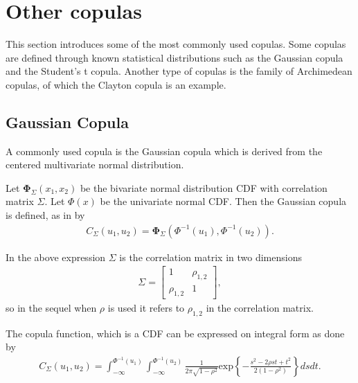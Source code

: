 \documentclass[%
a4paper,							
11pt,								
bibliography=totoc,						
abstracton=true					
]
{scrartcl}
\theoremstyle{plain}
\theoremstyle{definition}
\theoremstyle{remark}
\newcommand{\1}{\mathbbm{1}}
\begin{document}
\printbibliography


\section{Other copulas}\label{sec:OtherCopulas}
This section introduces some of the most commonly used copulas. Some copulas are defined through known statistical distributions such as the Gaussian copula and the Student's t copula. Another type of copulas is the family of Archimedean copulas, of which the Clayton copula is an example.

\subsection{Gaussian Copula}\label{sec:GaussianCopula}
A commonly used copula is the Gaussian copula which is derived from the centered multivariate normal distribution. 

Let $\boldsymbol{\Phi}_\Sigma(x_1,x_2)$ be the bivariate normal distribution \gls{CDF} with correlation matrix $\Sigma$. Let $\Phi(x)$ be the univariate normal \gls{CDF}. Then the Gaussian copula is defined, as in \citet[p.~112]{Umberto2004copulaMethods}  by 
\begin{align*}
    C_\Sigma(u_1,u_2) = \boldsymbol{\Phi}_\Sigma(\Phi^{-1}(u_1),\Phi^{-1}(u_2)).
\end{align*}

In the above expression $\Sigma$ is the correlation matrix in two dimensions 
\begin{align*}
    \Sigma = 
    \begin{bmatrix}
            1 & \rho_{1,2} \\
            \rho_{1,2} & 1
    \end{bmatrix},
\end{align*}
so in the sequel when $\rho$ is used it refers to $\rho_{1,2}$ in the correlation matrix.

The copula function, which is a \gls{CDF} can be expressed on integral form as done by \citet[p.~112]{Umberto2004copulaMethods}
\begin{align*}
     C_{\Sigma} (u_1,u_2)
    = \int_{-\infty}^{\Phi^{-1}(u_1)}\int_{-\infty}^{\Phi^{-1}(u_2)}
    \frac{1}{2\pi\sqrt{1-\rho^2}} \mathrm{exp}\left\{ - \frac{s^2-2\rho st+t^2}{2(1-\rho^2)}   \right\} dsdt.
\end{align*} 
\end{document}
